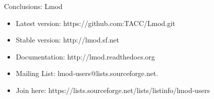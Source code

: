 \documentclass[dvipsnames,aspectratio=169]{beamer}
\begin{document}
\begin{frame}{Conclusions: Lmod}
  \begin{itemize}
    \item Latest version: https://github.com:TACC/Lmod.git
    \item Stable version: http://lmod.sf.net
    \item Documentation:  http://lmod.readthedocs.org
    \item Mailing List:   lmod-users@lists.sourceforge.net.
    \item Join here: https://lists.sourceforge.net/lists/listinfo/lmod-users
  \end{itemize}
\end{frame}


%
\end{document}
